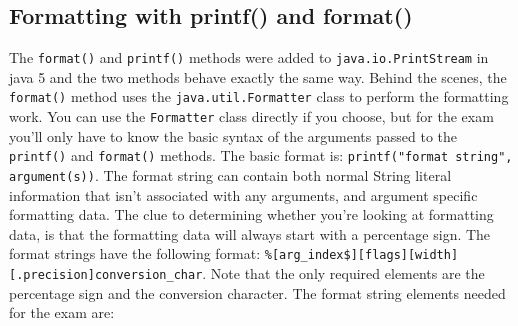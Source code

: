 \subsection{Formatting with printf() and format()}
The \verb#format()# and \verb#printf()# methods were added to 
\verb#java.io.PrintStream# in java 5 and the two methods behave exactly the 
same way. Behind the scenes, the \verb#format()# method uses the 
\verb#java.util.Formatter# class to perform the formatting work. You can use 
the \verb#Formatter# class directly if you choose, but for the exam you'll only 
have to know the basic syntax of the arguments passed to the \verb#printf()# 
and \verb#format()# methods. The basic format is:
\verb#printf("format string", argument(s))#. The format string can contain both 
normal String literal information that isn't associated with any arguments, and 
argument specific formatting data. The clue to determining whether you're 
looking at formatting data, is that the formatting data will always start with 
a percentage sign. The format strings have the following format:
\verb#%[arg_index$][flags][width][.precision]conversion_char#. Note that the 
only required elements are the percentage sign and the conversion character.  
The format string elements needed for the exam are:

